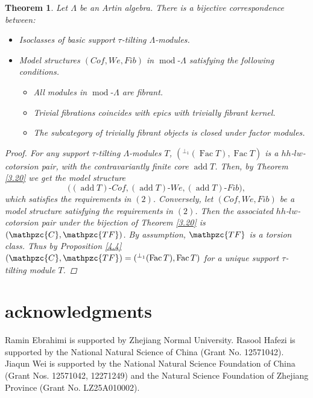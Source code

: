 \documentclass[12pt]{amsart}
\numberwithin{equation}{section}
\newtheorem{theorem}[lemma]{Theorem}
\theoremstyle{definition}
\DeclareMathOperator{\modd}{mod}
\DeclareMathOperator{\add}{add}
\DeclareMathOperator{\Fac}{Fac}
\newtheorem*{theorem 0*}{Theorem}
\newtheorem*{theorem a*}{Theorem A}
\newtheorem*{theorem b*}{Theorem B}
\numberwithin{diagram}{section}
\begin{document}
\begin{theorem}\label{4.5}
Let $\Lambda$ be an Artin algebra. There is a bijective correspondence between:
\begin{itemize}
\item[(1)]
Isoclasses of basic support $\tau$-tilting $\Lambda$-modules.
\item[(2)]
Model structures $(Cof,We,Fib)$ in $\modd\text{-}\Lambda$ satisfying the following conditions.
\begin{itemize}
\item[(i)]
All modules in $\modd\text{-}\Lambda$ are fibrant.
\item[(ii)]
Trivial fibrations coincides with epics with trivially fibrant kernel.
\item[(iii)]
The subcategory of trivially fibrant objects is closed under factor modules.
\end{itemize}
\end{itemize}
\begin{proof}
For any support $\tau$-tilting $\Lambda$-modules $T$, $({}^{\perp_1}(\Fac T),\Fac T)$ is a $hh$-$lw$-cotorsion pair, with the contravariantly finite core $\add T$. Then, by Theorem \ref{3.20} we get the model structure
\[\big((\add T)\text{-}Cof,(\add T)\text{-}We,(\add T)\text{-}Fib\big),\]
which satisfies the requirements in $(2)$.
Conversely, let $(Cof,We,Fib)$ be a model structure satisfying the requirements in $(2)$.
Then the associated $hh$-$lw$-cotorsion pair under the bijection of Theorem \ref{3.20} is $(\mathpzc{C},\mathpzc{TF})$.
By assumption, $\mathpzc{TF}$ is a torsion class. Thus by Proposition \ref{4.4} $(\mathpzc{C},\mathpzc{TF})=({}^{\perp_1}(\Fac T),\Fac T)$ for a unique support $\tau$-tilting module $T$.
\end{proof}
\end{theorem}

\section*{acknowledgments}
Ramin Ebrahimi is supported by Zhejiang Normal University.
Rasool Hafezi is supported by the National Natural Science of China (Grant No. 12571042).
Jiaqun Wei is supported by the National Natural Science Foundation of China (Grant Nos. 12571042, 12271249) and the Natural Science Foundation of Zhejiang Province (Grant No. LZ25A010002).
	
\end{document}
